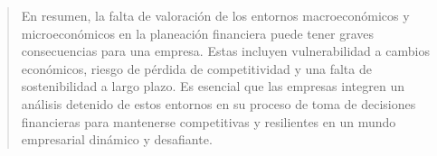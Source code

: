 \documentclass[a4paper,12pt]{article}
\begin{document}
\begin{quotation}
	\vspace{0.5cm}

	En resumen, la falta de valoración de los entornos macroeconómicos y microeconómicos en la planeación financiera puede tener graves consecuencias para una empresa. Estas incluyen vulnerabilidad a cambios económicos, riesgo de pérdida de competitividad y una falta de sostenibilidad a largo plazo. Es esencial que las empresas integren un análisis detenido de estos entornos en su proceso de toma de decisiones financieras para mantenerse competitivas y resilientes en un mundo empresarial dinámico y desafiante.
\end{quotation}
\end{document}
